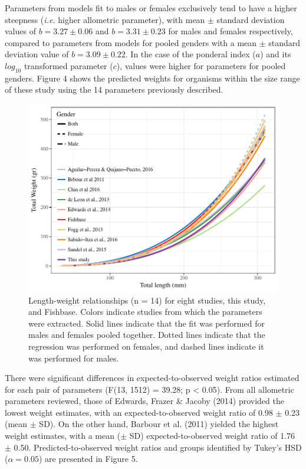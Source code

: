 \documentclass[12pt,]{article}
\begin{document}
Parameters from models fit to males or females exclusively tend to have
a higher steepness (\emph{i.e.} higher allometric parameter), with mean
\(\pm\) standard deviation values of \(b = 3.27 \pm 0.06\) and
\(b = 3.31 \pm 0.23\) for males and females respectively, compared to
parameters from models for pooled genders with a mean \(\pm\) standard
deviation value of \(b = 3.09 \pm 0.22\). In the case of the ponderal
index (\(a\)) and its \(log_{10}\) transformed parameter (\(c\)), values
were higher for parameters for pooled genders. Figure 4 shows the
predicted weights for organisms within the size range of these study
using the 14 parameters previously described.

\begin{figure}[htbp]
\centering
\includegraphics{Manuscript_files/figure-latex/review plots-1.pdf}
\caption{Length-weight relationships (n = 14) for eight studies, this
study, and Fishbase. Colors indicate studies from which the parameters
were extracted. Solid lines indicate that the fit was performed for
males and females pooled together. Dotted lines indicate that the
regression was performed on females, and dashed lines indicate it was
performed for males.}
\end{figure}

There were significant differences in expected-to-observed weight ratios
estimated for each pair of parameters (F(13, 1512) = 39.28; p
\textless{} 0.05). From all allometric parameters reviewed, those of
Edwards, Frazer \& Jacoby (2014) provided the lowest weight estimates,
with an expected-to-observed weight ratio of 0.98 \(\pm\) 0.23 (mean
\(\pm\) SD). On the other hand, Barbour et al. (2011) yielded the
highest weight estimates, with a mean (\(\pm\) SD) expected-to-observed
weight ratio of 1.76 \(\pm\) 0.50. Predicted-to-observed weight ratios
and groups identified by Tukey's HSD (\(\alpha = 0.05\)) are presented
in Figure 5.
\end{document}

